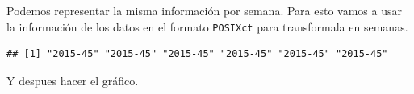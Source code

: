 \documentclass[
]{book}
\newenvironment{Shaded}{\begin{snugshade}}{\end{snugshade}}
\newcommand{\DataTypeTok}[1]{\textcolor[rgb]{0.13,0.29,0.53}{#1}}
\newcommand{\KeywordTok}[1]{\textcolor[rgb]{0.13,0.29,0.53}{\textbf{#1}}}
\newcommand{\NormalTok}[1]{#1}
\newcommand{\OperatorTok}[1]{\textcolor[rgb]{0.81,0.36,0.00}{\textbf{#1}}}
\newcommand{\StringTok}[1]{\textcolor[rgb]{0.31,0.60,0.02}{#1}}
\begin{document}
Podemos representar la misma información por semana. Para esto vamos a usar la información de los datos en el formato \texttt{POSIXct} para transformala en semanas.

\begin{Shaded}
\end{Shaded}

\begin{verbatim}
## [1] "2015-45" "2015-45" "2015-45" "2015-45" "2015-45" "2015-45"
\end{verbatim}

Y despues hacer el gráfico.
\end{document}
